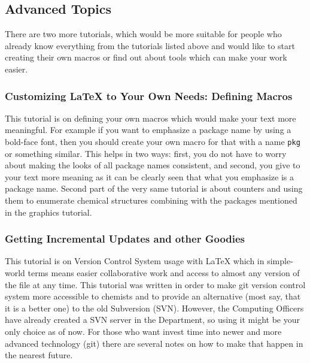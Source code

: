 \documentclass[
    draft
    ]{scrartcl}
\begin{document}
%
\subsection{Advanced Topics}

%
There are two more tutorials, which would be more suitable for people who
    already know everything from the tutorials listed above and would like to
    start creating their own macros or find out about tools which can make your
    work easier.
    
%
\subsubsection{Customizing \LaTeX{} to Your Own Needs: Defining Macros}

%
This tutorial is on defining your own macros which would make your text more
    meaningful.
%
For example if you want to emphasize a package name by using a bold-face font,
    then you should create your own macro for that with a name \verb|pkg| or
    something similar.
%
This helps in two ways: first, you do not have to worry about making the looks
    of all package names consistent, and second, you give to your text more
    meaning as it can be clearly seen that what you emphasize is a package name.
%
Second part of the very same tutorial is about counters and using them to
    enumerate chemical structures combining with the packages mentioned in the
    graphics tutorial.

%
\subsubsection{Getting Incremental Updates and other Goodies}

%
This tutorial is on Version Control System usage with \LaTeX{} which in
    simple-world terms means easier collaborative work and access to almost any
    version of the file at any time.
%
This tutorial was written in order to make git version control system more
    accessible to chemists and to provide an alternative (most say, that it is a
    better one) to the old Subversion (SVN).
%
However, the Computing Officers have already created a SVN server in the
    Department, so using it might be your only choice as of now.
%
For those who want invest time into newer and more advanced technology (git)
    there are several notes on how to make that happen in the nearest future.

\end{document}
